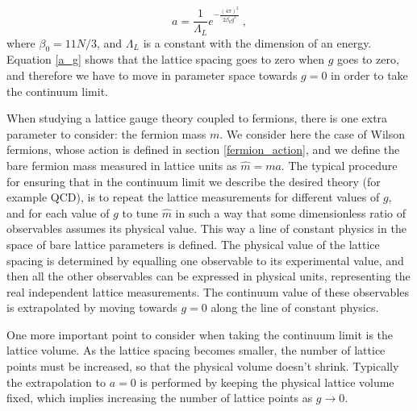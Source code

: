 \begin{equation}
a = \frac{1}{\Lambda_L} e^{-\frac{(4\pi)^2}{2 \beta_0 g^2}} \: ,
\label{a_g}
\end{equation}
%
where $\beta_0 = 11 N/3$, and $\Lambda_L$ is a constant with the dimension of an energy. Equation \ref{a_g} shows that the lattice spacing goes to zero when $g$ goes to zero, and therefore we have to move in parameter space towards $g=0$ in order to take the continuum limit.

When studying a lattice gauge theory coupled to fermions, there is one extra parameter to consider: the fermion mass $m$. We consider here the case of Wilson fermions, whose action is defined in section \ref{fermion_action}, and we define the bare fermion mass measured in lattice units as $\hat m = m a$. The typical procedure for ensuring that in the continuum limit we describe the desired theory (for example QCD), is to repeat the lattice measurements for different values of $g$, and for each value of $g$ to tune $\hat m$ in such a way that some dimensionless ratio of observables assumes its physical value. This way a line of constant physics in the space of bare lattice parameters is defined. The physical value of the lattice spacing is determined by equalling one observable to its experimental value, and then all the other observables can be expressed in physical units, representing the real independent lattice measurements. The continuum value of these observables is extrapolated by moving towards $g=0$ along the line of constant physics.


One more important point to consider when taking the continuum limit is the lattice volume. As the lattice spacing becomes smaller, the number of lattice points must be increased, so that the physical volume doesn't shrink. Typically the extrapolation to $a = 0$ is performed by keeping the physical lattice volume fixed, which implies increasing the number of lattice points as $g \to 0$.






